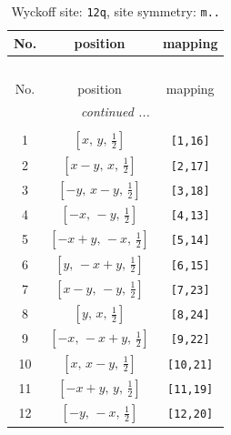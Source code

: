 \documentclass[fleqn,8pt]{jsarticle}
\begin{document}
\begin{longtable}{ccc}
\caption{Wyckoff site: {\tt 12q}, site symmetry: {\tt m..}}
 \\
 \hline \hline
No. & position & mapping \\ \hline \endfirsthead

\multicolumn{2}{l}{\tablename\ \thetable{}} \\
 \hline \hline
No. & position & mapping \\ \hline \endhead

 \hline \hline
\multicolumn{2}{r}{\footnotesize\it continued ...} \\ \endfoot

 \hline \hline
\multicolumn{2}{r}{} \\ \endlastfoot

1 & $\left[ x,\, y,\, \frac{1}{2} \right]$ & {\tt [1,16]} \\ \hline
2 & $\left[ x - y,\, x,\, \frac{1}{2} \right]$ & {\tt [2,17]} \\ \hline
3 & $\left[ - y,\, x - y,\, \frac{1}{2} \right]$ & {\tt [3,18]} \\ \hline
4 & $\left[ - x,\, - y,\, \frac{1}{2} \right]$ & {\tt [4,13]} \\ \hline
5 & $\left[ - x + y,\, - x,\, \frac{1}{2} \right]$ & {\tt [5,14]} \\ \hline
6 & $\left[ y,\, - x + y,\, \frac{1}{2} \right]$ & {\tt [6,15]} \\ \hline
7 & $\left[ x - y,\, - y,\, \frac{1}{2} \right]$ & {\tt [7,23]} \\ \hline
8 & $\left[ y,\, x,\, \frac{1}{2} \right]$ & {\tt [8,24]} \\ \hline
9 & $\left[ - x,\, - x + y,\, \frac{1}{2} \right]$ & {\tt [9,22]} \\ \hline
10 & $\left[ x,\, x - y,\, \frac{1}{2} \right]$ & {\tt [10,21]} \\ \hline
11 & $\left[ - x + y,\, y,\, \frac{1}{2} \right]$ & {\tt [11,19]} \\ \hline
12 & $\left[ - y,\, - x,\, \frac{1}{2} \right]$ & {\tt [12,20]} \\
\end{longtable}
\renewcommand{\arraystretch}{1.2}
\end{document}
